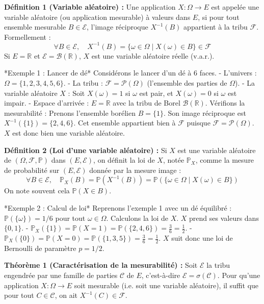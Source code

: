 \documentclass[11pt,a4paper]{article}
\begin{document}
\textbf{Définition 1 (Variable aléatoire) :}
Une application $X : \Omega \to E$ est appelée une variable aléatoire (ou application mesurable) à valeurs dans $E$, si pour tout ensemble mesurable $B \in \mathcal{E}$, l'image réciproque $X^{-1}(B)$ appartient à la tribu $\mathcal{F}$.
Formellement :
$$ \forall B \in \mathcal{E}, \quad X^{-1}(B) = \{ \omega \in \Omega \mid X(\omega) \in B \} \in \mathcal{F} $$
Si $E = \mathbb{R}$ et $\mathcal{E} = \mathcal{B}(\mathbb{R})$, $X$ est une variable aléatoire réelle (v.a.r.).

*Exemple 1 : Lancer de dé*
Considérons le lancer d'un dé à 6 faces.
- L'univers : $\Omega = \{1, 2, 3, 4, 5, 6\}$.
- La tribu : $\mathcal{F} = \mathcal{P}(\Omega)$ (l'ensemble des parties de $\Omega$).
- La variable aléatoire $X$ : Soit $X(\omega) = 1$ si $\omega$ est pair, et $X(\omega) = 0$ si $\omega$ est impair.
- Espace d'arrivée : $E = \mathbb{R}$ avec la tribu de Borel $\mathcal{B}(\mathbb{R})$.
Vérifions la mesurabilité : Prenons l'ensemble borélien $B = \{1\}$. Son image réciproque est $X^{-1}(\{1\}) = \{2, 4, 6\}$. Cet ensemble appartient bien à $\mathcal{F}$ puisque $\mathcal{F} = \mathcal{P}(\Omega)$. $X$ est donc bien une variable aléatoire.

\textbf{Définition 2 (Loi d'une variable aléatoire) :}
Si $X$ est une variable aléatoire de $(\Omega, \mathcal{F}, \mathbb{P})$ dans $(E, \mathcal{E})$, on définit la loi de $X$, notée $\mathbb{P}_X$, comme la mesure de probabilité sur $(E, \mathcal{E})$ donnée par la mesure image :
$$ \forall B \in \mathcal{E}, \quad \mathbb{P}_X(B) = \mathbb{P}(X^{-1}(B)) = \mathbb{P}(\{\omega \in \Omega \mid X(\omega) \in B\}) $$
On note souvent cela $\mathbb{P}(X \in B)$.

*Exemple 2 : Calcul de loi*
Reprenons l'exemple 1 avec un dé équilibré : $\mathbb{P}(\{\omega\}) = 1/6$ pour tout $\omega \in \Omega$.
Calculons la loi de $X$. $X$ prend ses valeurs dans $\{0, 1\}$.
- $\mathbb{P}_X(\{1\}) = \mathbb{P}(X = 1) = \mathbb{P}(\{2, 4, 6\}) = \frac{3}{6} = \frac{1}{2}$.
- $\mathbb{P}_X(\{0\}) = \mathbb{P}(X = 0) = \mathbb{P}(\{1, 3, 5\}) = \frac{3}{6} = \frac{1}{2}$.
$X$ suit donc une loi de Bernoulli de paramètre $p = 1/2$.

\textbf{Théorème 1 (Caractérisation de la mesurabilité) :}
Soit $\mathcal{E}$ la tribu engendrée par une famille de parties $\mathcal{C}$ de $E$, c'est-à-dire $\mathcal{E} = \sigma(\mathcal{C})$.
Pour qu'une application $X : \Omega \to E$ soit mesurable (i.e. soit une variable aléatoire), il suffit que pour tout $C \in \mathcal{C}$, on ait $X^{-1}(C) \in \mathcal{F}$.
\end{document}
